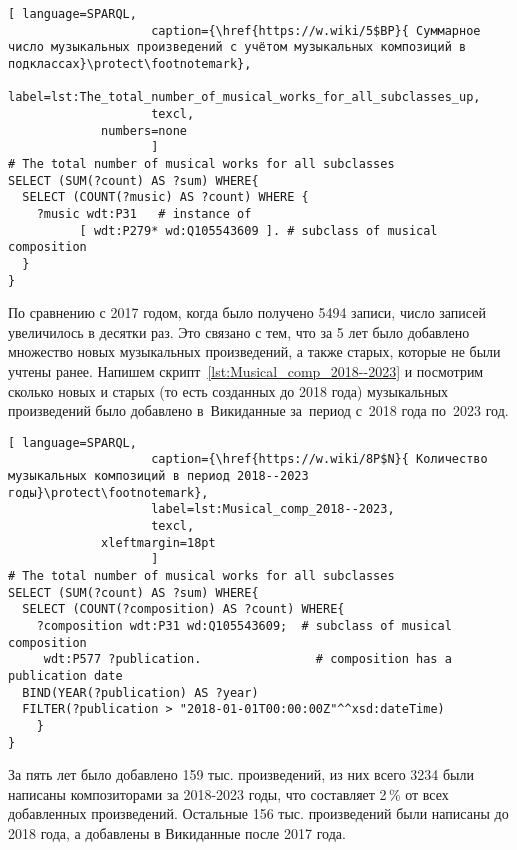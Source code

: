 \begin{lstlisting}[ language=SPARQL,
                    caption={\href{https://w.wiki/5$BP}{ Суммарное число музыкальных произведений с учётом музыкальных композиций в подклассах}\protect\footnotemark},
                    label=lst:The_total_number_of_musical_works_for_all_subclasses_up,
                    texcl,
	         numbers=none
                    ]
# The total number of musical works for all subclasses 
SELECT (SUM(?count) AS ?sum) WHERE{
  SELECT (COUNT(?music) AS ?count) WHERE {
    ?music wdt:P31   # instance of
          [ wdt:P279* wd:Q105543609 ]. # subclass of musical composition
  }
}
\end{lstlisting}%

По сравнению с 2017 годом, когда было получено \num{5494} записи, число записей увеличилось в десятки раз. Это связано с тем, что за 5 лет было добавлено множество новых музыкальных произведений, а также старых, которые не были учтены ранее.
Напишем скрипт~\ref{lst:Musical_comp_2018--2023} и посмотрим сколько новых и старых (то есть созданных до 2018 года) музыкальных произведений было добавлено в~Викиданные за~период с~2018 года по~2023 год.

\begin{lstlisting}[ language=SPARQL,
                    caption={\href{https://w.wiki/8P$N}{ Количество музыкальных композиций в период 2018--2023 годы}\protect\footnotemark},
                    label=lst:Musical_comp_2018--2023,
                    texcl,
	         xleftmargin=18pt
                    ]
# The total number of musical works for all subclasses 
SELECT (SUM(?count) AS ?sum) WHERE{
  SELECT (COUNT(?composition) AS ?count) WHERE{
    ?composition wdt:P31 wd:Q105543609;  # subclass of musical composition
     wdt:P577 ?publication.                # composition has a publication date
  BIND(YEAR(?publication) AS ?year)
  FILTER(?publication > "2018-01-01T00:00:00Z"^^xsd:dateTime)
    }
}
\end{lstlisting}%

За пять лет было добавлено \num{159} тыс. произведений, из них всего \num{3234} были написаны композиторами за 2018-2023 годы, что составляет 2\,\% от всех добавленных произведений. Остальные \num{156} тыс. произведений были написаны до 2018 года, а добавлены в Викиданные после 2017 года.

